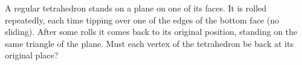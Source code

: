 A regular tetrahedron stands on a plane on one of its faces. It is rolled repeatedly, each time tipping over one of the edges of the bottom face (no sliding). After some rolls it comes back to its original position, standing on the same triangle of the plane. Must each vertex of the tetrahedron be back at its original place?
